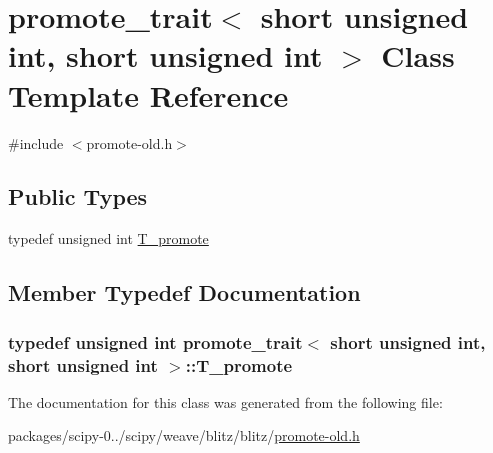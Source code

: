 \hypertarget{classpromote__trait_3_01short_01unsigned_01int_00_01short_01unsigned_01int_01_4}{}\section{promote\+\_\+trait$<$ short unsigned int, short unsigned int $>$ Class Template Reference}
\label{classpromote__trait_3_01short_01unsigned_01int_00_01short_01unsigned_01int_01_4}


{\ttfamily \#include $<$promote-\/old.\+h$>$}

\subsection*{Public Types}
\begin{DoxyCompactItemize}
\item 
typedef unsigned int \hyperlink{classpromote__trait_3_01short_01unsigned_01int_00_01short_01unsigned_01int_01_4_a38e8f0770a8e99bb01905e4c57deb1e5}{T\+\_\+promote}
\end{DoxyCompactItemize}


\subsection{Member Typedef Documentation}
\hypertarget{classpromote__trait_3_01short_01unsigned_01int_00_01short_01unsigned_01int_01_4_a38e8f0770a8e99bb01905e4c57deb1e5}{}
\subsubsection[{T\+\_\+promote}]{\setlength{\rightskip}{0pt plus 5cm}typedef unsigned int {\bf promote\+\_\+trait}$<$ short unsigned int, short unsigned int $>$\+::{\bf T\+\_\+promote}}\label{classpromote__trait_3_01short_01unsigned_01int_00_01short_01unsigned_01int_01_4_a38e8f0770a8e99bb01905e4c57deb1e5}


The documentation for this class was generated from the following file\+:\begin{DoxyCompactItemize}
\item 
packages/scipy-\/0../scipy/weave/blitz/blitz/\hyperlink{promote-old_8h}{promote-\/old.\+h}\end{DoxyCompactItemize}
